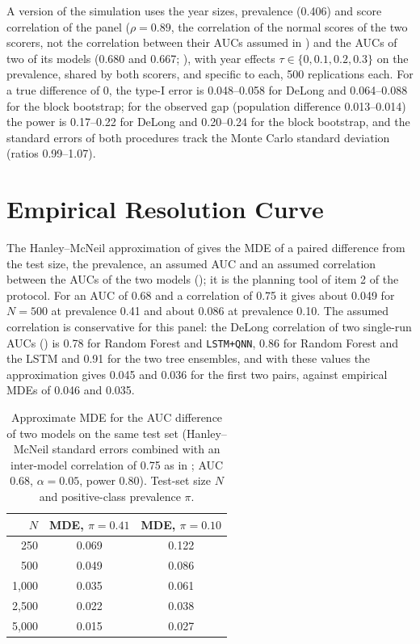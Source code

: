 \documentclass[11pt,a4paper]{article}
\begin{document}
A version of the simulation uses the year sizes, prevalence (0.406) and score correlation of the panel ($\rho=0.89$, the correlation of the normal scores of the two scorers, not the correlation between their AUCs assumed in ) and the AUCs of two of its models (0.680 and 0.667; ), with year effects $\tau\in\{0,0.1,0.2,0.3\}$ on the prevalence, shared by both scorers, and specific to each, 500 replications each. For a true difference of 0, the type-I error is 0.048--0.058 for DeLong and 0.064--0.088 for the block bootstrap; for the observed gap (population difference 0.013--0.014) the power is 0.17--0.22 for DeLong and 0.20--0.24 for the block bootstrap, and the standard errors of both procedures track the Monte Carlo standard deviation (ratios 0.99--1.07).

\section{Empirical Resolution Curve}
\label{app:resolution}

The Hanley--McNeil approximation of  gives the MDE of a paired difference from the test size, the prevalence, an assumed AUC and an assumed correlation between the AUCs of the two models (); it is the planning tool of item 2 of the protocol. For an AUC of 0.68 and a correlation of 0.75 it gives about 0.049 for $N=500$ at prevalence 0.41 and about 0.086 at prevalence 0.10. The assumed correlation is conservative for this panel: the DeLong correlation of two single-run AUCs () is 0.78 for Random Forest and \texttt{LSTM+QNN}, 0.86 for Random Forest and the LSTM and 0.91 for the two tree ensembles, and with these values the approximation gives 0.045 and 0.036 for the first two pairs, against empirical MDEs of 0.046 and 0.035.

\begin{table}[htbp]
\centering
\caption{Approximate MDE for the AUC difference of two models on the same test set (Hanley--McNeil standard errors combined with an inter-model correlation of 0.75 as in \citealp{hanley1983}; AUC 0.68, $\alpha=0.05$, power 0.80). Test-set size $N$ and positive-class prevalence $\pi$.}
\label{tab:hm_mde}
{\small
\begin{tabular}{rcc}
\toprule
$N$ & MDE, $\pi=0.41$ & MDE, $\pi=0.10$ \\
\midrule
250 & 0.069 & 0.122 \\
500 & 0.049 & 0.086 \\
1{,}000 & 0.035 & 0.061 \\
2{,}500 & 0.022 & 0.038 \\
5{,}000 & 0.015 & 0.027 \\
\bottomrule
\end{tabular}%
}
\end{table}
\end{document}
